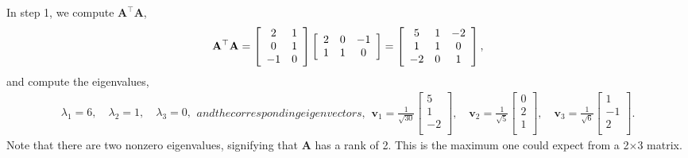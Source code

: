 In step 1, we compute $\mathbf{A}^\top \mathbf{A}$,
\begin{align}
  \mathbf{A}^\top \mathbf{A} = 
  \left[ \begin{array}{c c}
   2 &  1 \\
   0 &  1 \\ 
  -1 &  0 \\ \end{array}  \right]
   \left[ \begin{array}{c c c}
   2 &  0 & -1 \\
   1 &  1 &  0 \\ \end{array}  \right] =
   \left[ \begin{array}{c c c}
   5 &  1 & -2 \\
   1 &  1 &  0 \\ 
  -2 &  0 &  1 \\ \end{array} \right] ,
\end{align}
and compute the eigenvalues,
\begin{subequations}
\begin{align}
  \lambda_1 = 6, \quad \lambda_2 = 1, \quad \lambda_3 = 0,
\end{align}
and the corresponding eigenvectors,
\begin{align}
  \mathbf{v}_1 = \frac{1}{\sqrt{30}} \left[ \begin{array}{c}  5 \\  1 \\ -2 \\ \end{array} \right], \quad 
  \mathbf{v}_2 = \frac{1}{\sqrt{ 5}} \left[ \begin{array}{c}  0 \\  2 \\  1 \\ \end{array} \right], \quad 
  \mathbf{v}_3 = \frac{1}{\sqrt{ 6}} \left[ \begin{array}{c}  1 \\ -1 \\  2 \\ \end{array} \right].
\end{align}
\end{subequations}
Note that there are two nonzero eigenvalues, signifying that $\mathbf{A}$ has a rank of 2. This is the maximum one could expect from a 2$\times$3 matrix.

